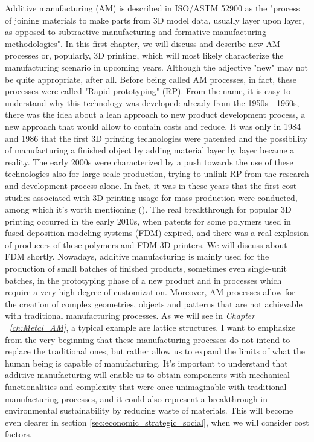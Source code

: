 Additive manufacturing (AM) is described in ISO/ASTM 52900 \cite{international_standard_organization_isoastm_2015} as the "process of joining materials to make parts from 3D model data, usually layer upon layer, as opposed to subtractive manufacturing and formative manufacturing methodologies".
In this first chapter, we will discuss and describe new AM processes or, popularly, 3D printing, which will most likely characterize the manufacturing scenario in upcoming years. Although the adjective "new" may not be quite appropriate, after all. Before being called AM processes, in fact, these processes were called "Rapid prototyping" (RP). From the name, it is easy to understand why this technology was developed: already from the 1950s - 1960s, there was the idea about a lean approach to new product development process, a new approach that would allow to contain costs and reduce. It was only in 1984 and 1986 that the first 3D printing technologies were patented and the possibility of manufacturing a finished object by adding material layer by layer became a reality. The early 2000s were characterized by a push towards the use of these technologies also for large-scale production, trying to unlink RP from the research and development process alone. In fact, it was in these years that the first cost studies associated with 3D printing usage for mass production were conducted, among which it's worth mentioning \citeauthor{hopkinson_analysis_2003} (\citeyear{hopkinson_analysis_2003}). The real breakthrough for popular 3D printing occurred in the early 2010s, when patents for some polymers used in fused deposition modeling systems (FDM) expired, and there was a real explosion of producers of these polymers and FDM 3D printers. We will discuss about FDM shortly. Nowadays, additive manufacturing is mainly used for the production of small batches of finished products, sometimes even single-unit batches, in the prototyping phase of a new product and in processes which require a very high degree of customization. Moreover, AM processes allow for the creation of complex geometries, objects and patterns that are not achievable with traditional manufacturing processes. As we will see in \textit{Chapter ~\ref{ch:Metal_AM}}, a typical example are lattice structures. 
I want to emphasize from the very beginning that these manufacturing processes do not intend to replace the traditional ones, but rather allow us to expand the limits of what the human being is capable of manufacturing. It's important to understand that additive manufacturing will enable us to obtain components with mechanical functionalities and complexity that were once unimaginable with traditional manufacturing processes, and it could also represent a breakthrough in environmental sustainability by reducing waste of materials. This will become even clearer in section \ref{sec:economic_strategic_social}, when we will consider cost factors.


